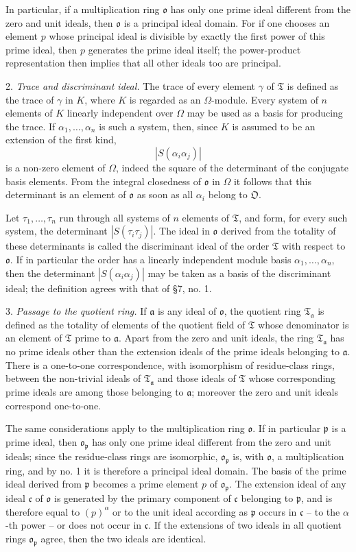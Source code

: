 \documentclass[11pt]{article}
\providecommand{\mT}{\mathfrak{T}}
\providecommand{\mO}{\mathfrak{O}}
\providecommand{\mo}{\mathfrak{o}}
\providecommand{\ma}{\mathfrak{a}}
\providecommand{\mc}{\mathfrak{c}}
\providecommand{\mpideal}{\mathfrak{p}}
\begin{document}
In particular, if a multiplication ring $\mo$ has only one prime ideal different from the zero and unit ideals, then $\mo$ is a principal ideal domain. For if one chooses an element $p$ whose principal ideal is divisible by exactly the first power of this prime ideal, then $p$ generates the prime ideal itself; the power-product representation then implies that all other ideals too are principal.

2. \emph{Trace and discriminant ideal.} The trace of every element $\gamma$ of $\mT$ is defined as the trace of $\gamma$ in $K$, where $K$ is regarded as an $\Omega$-module. Every system of $n$ elements of $K$ linearly independent over $\Omega$ may be used as a basis for producing the trace. If $\alpha_1,\ldots,\alpha_n$ is such a system, then, since $K$ is assumed to be an extension of the first kind,
\[
        |S(\alpha_i\alpha_j)|
\]
is a non-zero element of $\Omega$, indeed the square of the determinant of the conjugate basis elements. From the integral closedness of $\mo$ in $\Omega$ it follows that this determinant is an element of $\mo$ as soon as all $\alpha_i$ belong to $\mO$.

Let $\tau_1,\ldots,\tau_n$ run through all systems of $n$ elements of $\mT$, and form, for every such system, the determinant $|S(\tau_i\tau_j)|$. The ideal in $\mo$ derived from the totality of these determinants is called the discriminant ideal of the order $\mT$ with respect to $\mo$. If in particular the order has a linearly independent module basis $\alpha_1,\ldots,\alpha_n$, then the determinant $|S(\alpha_i\alpha_j)|$ may be taken as a basis of the discriminant ideal; the definition agrees with that of §7, no. 1.

3. \emph{Passage to the quotient ring.} If $\ma$ is any ideal of $\mo$, the quotient ring $\mT_\ma$ is defined as the totality of elements of the quotient field of $\mT$ whose denominator is an element of $\mT$ prime to $\ma$. Apart from the zero and unit ideals, the ring $\mT_\ma$ has no prime ideals other than the extension ideals of the prime ideals belonging to $\ma$. There is a one-to-one correspondence, with isomorphism of residue-class rings, between the non-trivial ideals of $\mT_\ma$ and those ideals of $\mT$ whose corresponding prime ideals are among those belonging to $\ma$; moreover the zero and unit ideals correspond one-to-one.

The same considerations apply to the multiplication ring $\mo$. If in particular $\mpideal$ is a prime ideal, then $\mo_\mpideal$ has only one prime ideal different from the zero and unit ideals; since the residue-class rings are isomorphic, $\mo_\mpideal$ is, with $\mo$, a multiplication ring, and by no. 1 it is therefore a principal ideal domain. The basis of the prime ideal derived from $\mpideal$ becomes a prime element $p$ of $\mo_\mpideal$. The extension ideal of any ideal $\mc$ of $\mo$ is generated by the primary component of $\mc$ belonging to $\mpideal$, and is therefore equal to $(p)^\alpha$ or to the unit ideal according as $\mpideal$ occurs in $\mc$ -- to the $\alpha$-th power -- or does not occur in $\mc$. If the extensions of two ideals in all quotient rings $\mo_\mpideal$ agree, then the two ideals are identical.
\end{document}
